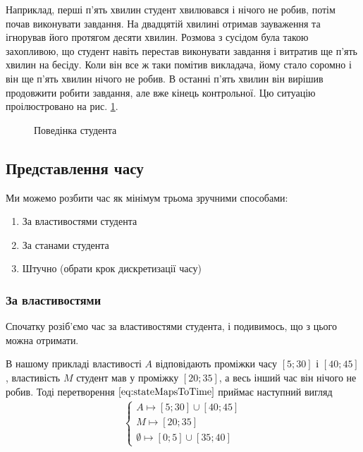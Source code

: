 Наприклад, перші п’ять хвилин студент хвилювався і нічого не робив, потім
почав виконувати завдання.
На двадцятій хвилині отримав зауваження та ігнорував його протягом десяти
хвилин.
Розмова з сусідом була такою захопливою, що студент навіть перестав виконувати
завдання і витратив ще п’ять хвилин на бесіду.
Коли він все ж таки помітив викладача, йому стало соромно і він ще п’ять хвилин
нічого не робив.
В останні п’ять хвилин він вирішив продовжити робити завдання, але вже кінець
контрольної.
Цю ситуацію проілюстровано на рис. \ref{fig:tikz:studentBehaviorSimple}.

\begin{figure}[h]
  \center
  \caption{Поведінка студента}
  \label{fig:tikz:studentBehaviorSimple}
\end{figure}

\subsection{Представлення часу}
Ми можемо розбити час як мінімум трьома зручними способами:
\begin{enumerate}
  \item
    За властивостями студента
  \item
    За станами студента
  \item
    Штучно (обрати крок дискретизації часу)
\end{enumerate}

\subsubsection{За властивостями}
Спочатку розіб’ємо час за властивостями студента, і подивимось, що з цього можна
отримати.

В нашому прикладі властивості $A$ відповідають проміжки часу
$\left[ 5; 30 \right]$ і $\left[ 40; 45 \right]$, властивість $M$ студент мав
у проміжку $\left[ 20; 35 \right]$, а весь інший час він нічого не робив.
Тоді перетворення $\eqref{eq:stateMapsToTime}$ приймає наступний вигляд
\begin{align}\label{eq:discretizationByProperties}
  \begin{cases}
    A \mapsto \left[ 5; 30 \right] \cup \left[ 40; 45 \right] \\
    M \mapsto \left[ 20; 35 \right] \\
    \emptyset \mapsto \left[ 0; 5 \right] \cup \left[ 35; 40 \right]
  \end{cases}
\end{align}

